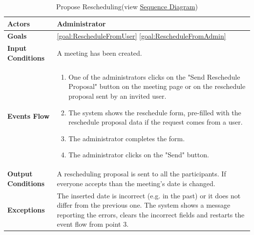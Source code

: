 \begin{table}[H]
	\centering
	\def\arraystretch{1.5}
	\begin{tabular}{|m{7cm}|m{7cm}|}
		\hline
		\textbf{Actors}           & Administrator    \\ \hline
		\textbf{Goals}            & \ref{goal:RescheduleFromUser} \newline \ref{goal:RescheduleFromAdmin}           \\ \hline
		{\textbf{Input Conditions}}  & A meeting has been created.           \\ \hline
		{\textbf{Events Flow}}       &
		\begin{enumerate}[topsep=0pt, leftmargin=*]					
			\item One of the administrators clicks on the "Send Reschedule Proposal" button on the meeting page or on the reschedule proposal sent by an invited user.
			\item The system shows the reschedule form, pre-filled with the reschedule proposal data if the request comes from a user.
			\item The administrator completes the form.
			\item The administrator clicks on the "Send" button.
		\end{enumerate}                         \\ \hline
		\textbf{Output Conditions} & A rescheduling proposal is sent to all the participants. If everyone accepts than the meeting's date is changed.         \\ \hline
		\textbf{Exceptions}        & The inserted date is incorrect (e.g. in the past) or it does not differ from the previous one. The system shows a message reporting the errors, clears the incorrect fields and restarts the event flow from point 3.  \\ \hline
	\end{tabular}
	\caption[Propose Rescheduling]{{Propose Rescheduling}\label{UseCaseDescr:ProposeRes} (view \hyperref[SeqDiagr:ProposeRes]{Sequence Diagram})}
\end{table}

\newpage